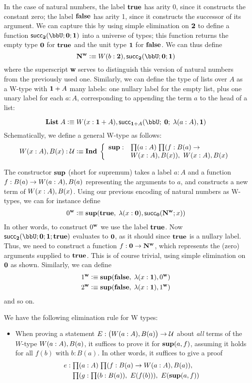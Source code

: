 In the case of natural numbers, the label $\mathbf{true} $ has arity 0, since it constructs the constant zero; the label $\mathbf{false}$ has arity 1, since it constructs the successor of its argument. We can capture this by using simple elimination on $\mathbf{2}$ to define a function $\rec_\two(\bbU;\zero;\one)$ into a universe of types; this function returns the empty type $\mathbf{0}$ for $\mathbf{true}$ and the unit type $\mathbf{1}$ for $\mathbf{false}$. We can thus define
\[ \natw \defeq \wtype{b:\two} \rec_\two(\bbU;\zero;\one) \]
where the superscript \textbf{w} serves to distinguish this version of natural numbers from the previously used one.
Similarly, we can define the type of lists over $A$ as a W-type with $\mathbf{1} + A$ many labels: one nullary label for the empty list, plus one unary label for each $a : A$, corresponding to appending the term $a$ to the head of a list:

\[ \lst \; A \defeq \wtype{x:\disj{\one}{A}} \rec_{\disj{\one}{A}}(\bbU; \; \zero; \; \lambda{(a:A)}, \one) \]
Schematically, we define a general W-type as follows:
\[ \wtype{x:A} B(x) : \type \defeq \ind \left\{
\begin{array}{ll}
\supp : & \prd{a:A}{f : B(a) \to \\ & \wtype{x:A} B(x)}  \wtype{x:A} B(x)
\end{array}
\right. \]

The constructor $\mathbf{sup}$ (short for supremum) takes a label $a : A$ and a function $f : B(a) \to W(a:A), B(a)$ representing the arguments to $a$, and constructs a new term of $W(x:A), B(x)$. Using our previous encoding of natural numbers as W-types, we can for instance define
\begin{align*}
0^\mathbf{w} \vcentcolon\equiv \mathbf{sup}(\mathbf{true}, \; \lambda(x : \mathbf{0}), \mathsf{succ}_\mathbf{0}(\mathbf{N^w};x))
\end{align*}
In other words, to construct $0^\mathbf{w}$ we use the label $\mathbf{true}$. Now $\rec_\two(\bbU;\zero;\one; \true)$ evaluates to $\mathbf{0}$, as it should since $\mathbf{true}$ is a nullary label. Thus, we need to construct a function $f : \mathbf{0} \to \mathbf{N^w}$, which represents the (zero) arguments supplied to $\mathbf{true}$. This is of course trivial, using simple elimination on $\mathbf{0}$ as shown. Similarly, we can define
\begin{align*}
1^\mathbf{w} \vcentcolon\equiv \mathbf{sup}(\mathbf{false}, \; \lambda(x : \mathbf{1}), 0^\mathbf{w}) \\
2^\mathbf{w} \vcentcolon\equiv \mathbf{sup}(\mathbf{false}, \; \lambda(x : \mathbf{1}), 1^\mathbf{w})
\end{align*}
and so on.

We have the following elimination rule for W types:
\begin{itemize}
\item When proving a statement $E : \big(W(a:A), B(a)\big) \to \mathcal{U}$ about \emph{all} terms of the $W$-type $W(a:A), B(a)$, it suffices to prove it for $\mathbf{sup}(a,f)$, assuming it holds for all $f(b)$ with $b : B(a)$. 
In other words, it suffices to give a proof 
\begin{align*}
e : & \; \prd{a:A}{f : B(a) \to \wtype{a:A} B(a)}\\ & \; \prd{g : \prd{b : B(a)} E(f(b))} E(\supp(a,f))
\end{align*}
\end{itemize}

